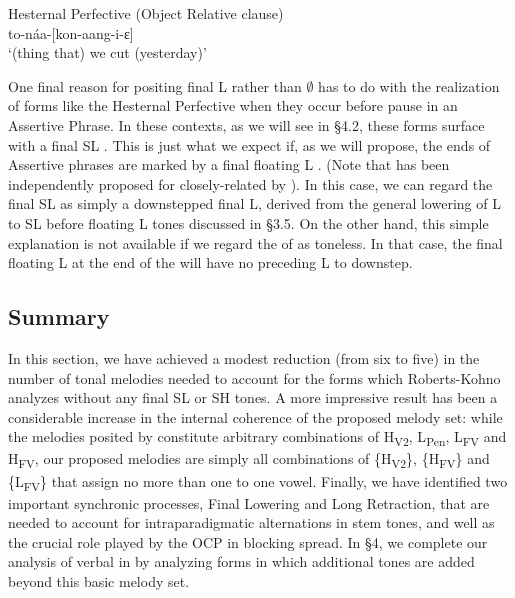 \documentclass[output=paper
,newtxmath
,modfonts
,nonflat]{langsci/langscibook}
\begin{document}
\ea\label{ex:jones:8}
\label{bkm:Ref359195867}Hesternal Perfective (Object Relative clause)\\
 to-náa-[kon-aang-i-ɛ]  \\
\glt ‘(thing that) we cut (yesterday)’
\z

One final reason for positing final L rather than ${\emptyset}$ has to do with the realization of forms like the Hesternal Perfective when they occur before pause in an Assertive Phrase. In these contexts, as we will see in §4.2, these forms surface with a final SL . This is just what we expect if, as we will propose, the ends of Assertive phrases are marked by a final floating L . (Note that has been independently proposed for closely-related  by \citet{Gjersoe2016}). In this case, we can regard the final SL  as simply a downstepped final L, derived from the general lowering of L to SL before floating L tones discussed in §3.5. On the other hand, this simple explanation is not available if we regard the  of  as toneless. In that case, the final floating L  at the end of the  will have no preceding L  to downstep.

\subsection{Summary}

In this section, we have achieved a modest reduction (from six to five) in the number of tonal melodies needed to account for the forms which Roberts-Kohno analyzes without any final SL or SH tones. A more impressive result has been a considerable increase in the internal coherence of the proposed melody set: while the melodies posited by \citet{Roberts-Kohno2014} constitute arbitrary combinations of H\textsubscript{V2}, L\textsubscript{Pen}, L\textsubscript{FV} and H\textsubscript{FV}, our proposed melodies are simply all combinations of \{H\textsubscript{V2}\}, \{H\textsubscript{FV}\} and \{L\textsubscript{FV}\} that assign no more than one  to one vowel. Finally, we have identified two important synchronic processes, Final Lowering and Long Retraction, that are needed to account for intraparadigmatic alternations in stem tones, and well as the crucial role played by the OCP in blocking  spread. In §4, we complete our analysis of verbal  in  by analyzing forms in which additional tones are added beyond this basic melody set.
\end{document}
